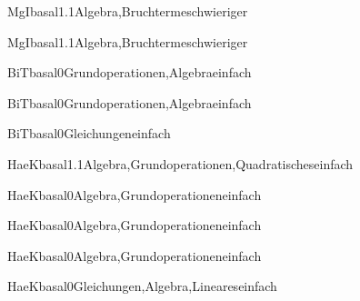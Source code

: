 \documentclass[12pt]{article}
\begin{document}
\begin{Add}{MgI}{basal1.1}{Algebra,Bruchterme}{schwieriger}
\end{Add}

\begin{Add}{MgI}{basal1.1}{Algebra,Bruchterme}{schwieriger}
\end{Add}



\begin{Add}{BiT}{basal0}{Grundoperationen,Algebra}{einfach}
\end{Add}

\begin{Add}{BiT}{basal0}{Grundoperationen,Algebra}{einfach}
\end{Add}

\begin{Add}{BiT}{basal0}{Gleichungen}{einfach}
      
\end{Add}


\begin{Add}{HaeK}{basal1.1}{Algebra,Grundoperationen,Quadratisches}{einfach}
\end{Add}

\begin{Add}{HaeK}{basal0}{Algebra,Grundoperationen}{einfach}
\end{Add}

\begin{Add}{HaeK}{basal0}{Algebra,Grundoperationen}{einfach}
\end{Add}

\begin{Add}{HaeK}{basal0}{Algebra,Grundoperationen}{einfach}
\end{Add}

\begin{Add}{HaeK}{basal0}{Gleichungen,Algebra,Lineares}{einfach}
      
\end{Add}
\end{document}
